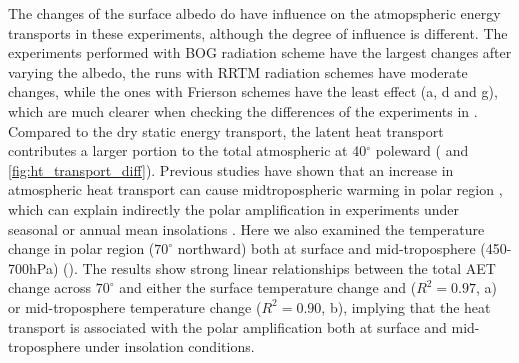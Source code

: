 
The changes of the surface albedo do have influence on the atmopspheric energy transports in these experiments, although the degree of influence is different. The experiments performed with BOG radiation scheme have the largest changes after varying the albedo, the runs with RRTM radiation schemes have moderate changes, while the ones with Frierson schemes have the least effect (a, d and g), which are much clearer when checking the differences of the experiments in . Compared to the dry static energy transport, the latent heat transport contributes a larger portion to the total atmospheric at 40$^\circ$ poleward ( and \ref{fig:ht_transport_diff}). Previous studies have shown that an increase in atmospheric heat transport can cause midtropospheric warming in polar region \citep[e.g.,][]{Screen2012}, which can explain indirectly the polar amplification in experiments under seasonal or annual mean insolations \citep{Kim2018}.  Here we also examined the temperature change in polar region ($70^\circ$ northward) both at surface and mid-troposphere (450-700hPa) (). The results show strong linear relationships between the total AET change across $70^\circ$ and either the surface temperature change and ($R^2=0.97$, a) or mid-troposphere temperature change ($R^2=0.90$, b), implying that the heat transport is associated with the polar amplification both at surface and mid-troposphere under insolation conditions.



